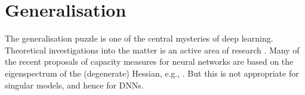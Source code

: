\documentclass[11pt]{article}
\def\lto{\longrightarrow}
\numberwithin{equation}{section}
\theoremstyle{plain}
\newtheorem{example}[theorem]{Example}
\theoremstyle{definition}
\begin{document}


\section{Generalisation}\label{section:gen_error}
The generalisation puzzle \citep{DBLP:journals/corr/abs-1801-00173} is one of the central mysteries of deep learning. Theoretical investigations into the matter is an active area of research \citet{neyshabur_exploring_2017}. Many of the recent proposals of capacity measures for neural networks are based on the eigenspectrum of the (degenerate) Hessian, e.g., \citet{thomas_information_2019, maddox_rethinking_2020}. But this is not appropriate for singular models, and hence for DNNs.
\end{document}
